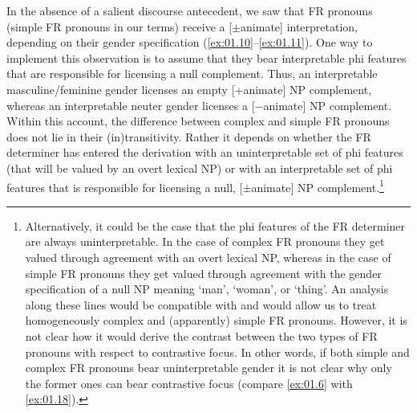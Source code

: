 \documentclass[output=paper]{langsci/langscibook}
\begin{document}
In the absence of a salient discourse antecedent, we saw that \gls{FR} pronouns
(simple \gls{FR} pronouns in our
terms) receive a [$\pm$animate] interpretation, depending on their gender
specification (\ref{ex:01.10}--\ref{ex:01.11}). One way to implement
this observation is to assume that they bear interpretable phi features that
are responsible for licensing a null complement. Thus, an interpretable
masculine/feminine gender licenses an empty [+animate] NP complement, whereas
an interpretable neuter gender licenses a [−animate] NP complement. Within this
account, the difference between complex and simple \gls{FR}
pronouns does not lie in their
(in)transitivity. Rather it depends on whether the \gls{FR} determiner has
entered the derivation with an uninterpretable set of phi features (that will
be valued by an overt lexical NP) or with an interpretable set of phi features
that is responsible for licensing a null, [$\pm$animate] NP
complement.\footnote{Alternatively, it could be the case that the phi features
    of the \gls{FR} determiner are always uninterpretable. In the case of
    complex \gls{FR} pronouns they
    get valued through agreement with an overt lexical NP, whereas in the case
    of simple \gls{FR} pronouns
    they get valued through agreement with the gender specification of a null
    NP meaning ‘man’, ‘woman’, or ‘thing’. An analysis along these lines would
    be compatible with \textcite{Panagiotidis2003} and would allow us to treat
    homogeneously complex and (apparently) simple \gls{FR} pronouns. However,
    it is not clear how it would derive the contrast between the two types of
    \gls{FR} pronouns with respect
    to contrastive focus. In other words, if both
    simple and complex \gls{FR} pronouns bear uninterpretable gender it is not
    clear why only the former ones can bear contrastive
    focus (compare \eqref{ex:01.6} with
\eqref{ex:01.18}).}
\end{document}
